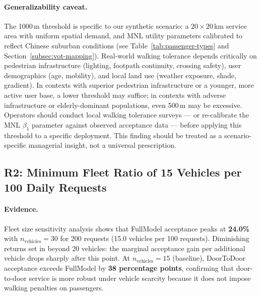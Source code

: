 \paragraph{Generalizability caveat.}
The 1000\,m threshold is specific to our synthetic scenario: a $20 \times 20$\,km
service area with uniform spatial demand, and MNL utility parameters calibrated
to reflect Chinese suburban conditions (see Table~\ref{tab:passenger-types} and
Section~\ref{subsec:vot-mapping}).
Real-world walking tolerance depends critically on pedestrian infrastructure
(lighting, footpath continuity, crossing safety), user demographics (age, mobility),
and local land use (weather exposure, shade, gradient).
In contexts with superior pedestrian infrastructure or a younger, more active user
base, a lower threshold may suffice; in contexts with adverse infrastructure or
elderly-dominant populations, even 500\,m may be excessive.
Operators should conduct local walking tolerance surveys --- or re-calibrate the
MNL $\beta_1$ parameter against observed acceptance data --- before applying this
threshold to a specific deployment.
This finding should be treated as a scenario-specific managerial insight,
not a universal prescription.

\subsection{R2: Minimum Fleet Ratio of 15 Vehicles per 100 Daily Requests}

\paragraph{Evidence.}
Fleet size sensitivity analysis shows that FullModel acceptance peaks at
\textbf{24.0\%} with $n_{\text{vehicles}} = 30$ for 200 requests (15.0
vehicles per 100 requests). Diminishing returns set in beyond 20 vehicles:
the marginal acceptance gain per additional vehicle drops sharply after this
point. At $n_{\text{vehicles}} = 15$ (baseline), DoorToDoor acceptance
exceeds FullModel by \textbf{38 percentage points}, confirming that
door-to-door service is more robust under vehicle scarcity because it does
not impose walking penalties on passengers.

